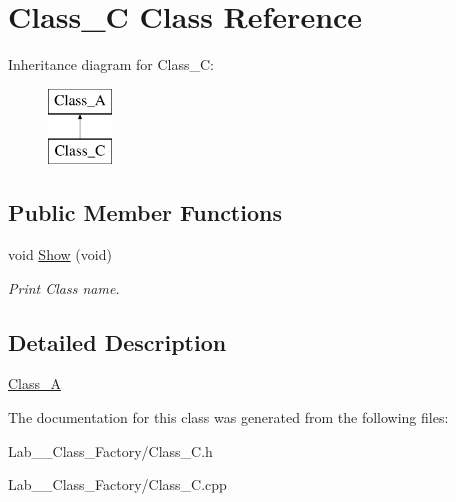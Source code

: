 \hypertarget{class_class___c}{\section{Class\+\_\+\+C Class Reference}
\label{class_class___c}
}
Inheritance diagram for Class\+\_\+\+C\+:\begin{figure}[H]
\begin{center}
\leavevmode
\includegraphics[height=2.000000cm]{class_class___c}
\end{center}
\end{figure}
\subsection*{Public Member Functions}
\begin{DoxyCompactItemize}
\item 
\hypertarget{class_class___c_abd1e1a1b11a87bb9c3dbe7fe208e4e63}{void \hyperlink{class_class___c_abd1e1a1b11a87bb9c3dbe7fe208e4e63}{Show} (void)}\label{class_class___c_abd1e1a1b11a87bb9c3dbe7fe208e4e63}

\begin{DoxyCompactList}\small\item\em Print Class name. \end{DoxyCompactList}\end{DoxyCompactItemize}


\subsection{Detailed Description}
\hyperlink{class_class___a}{Class\+\_\+\+A} 

The documentation for this class was generated from the following files\+:\begin{DoxyCompactItemize}
\item 
Lab\+\_\+\_\+\+Class\+\_\+\+Factory/Class\+\_\+\+C.\+h\item 
Lab\+\_\+\_\+\+Class\+\_\+\+Factory/Class\+\_\+\+C.\+cpp\end{DoxyCompactItemize}
